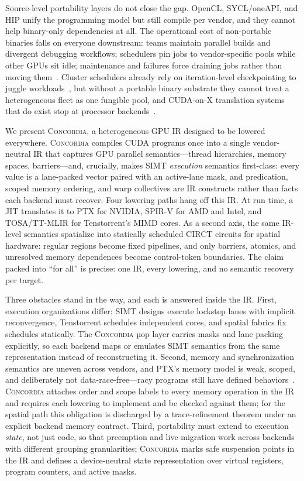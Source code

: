 \documentclass[sigplan,nonacm]{acmart}
\newcommand{\sys}{\textsc{Concordia}\xspace}
\newcommand{\circt}{CIRCT\xspace}
\begin{document}
Source-level portability layers do not close the gap.  OpenCL, SYCL/oneAPI,
and HIP unify the programming model but still compile per vendor, and they
cannot help binary-only dependencies at all.  The operational cost of
non-portable binaries falls on everyone downstream: teams maintain parallel
builds and divergent debugging workflows; schedulers pin jobs to
vendor-specific pools while other GPUs sit idle; maintenance and failures
force draining jobs rather than moving
them~\cite{xiao2018gandiva,gu2019tiresias,narayanan2020gavel,yu2020salus}.
Cluster schedulers already rely on iteration-level checkpointing to juggle
workloads~\cite{narayanan2020gavel}, but without a portable binary substrate
they cannot treat a heterogeneous fleet as one fungible pool, and
CUDA-on-X translation systems that do exist stop at processor
backends~\cite{huang2023cupbop}.

We present \sys, a heterogeneous GPU IR designed to be lowered everywhere.
\sys compiles CUDA programs once into a single vendor-neutral IR that
captures GPU parallel semantics---thread hierarchies, memory spaces,
barriers---and, crucially, makes SIMT \emph{execution} semantics
first-class: every value is a lane-packed vector paired with an active-lane
mask, and predication, scoped memory ordering, and warp collectives are IR
constructs rather than facts each backend must recover.  Four lowering paths
hang off this IR.  At run time, a JIT translates it to PTX for NVIDIA,
SPIR-V for AMD and Intel, and TOSA/TT-MLIR for Tenstorrent's MIMD cores.  As
a second axis, the same IR-level semantics spatialize into statically
scheduled \circt circuits for spatial hardware: regular regions become fixed
pipelines, and only barriers, atomics, and unresolved memory dependences
become control-token boundaries.  The claim packed into ``for all'' is
precise: one IR, every lowering, and no semantic recovery per target.

Three obstacles stand in the way, and each is answered inside the IR.
First, execution organizations differ: SIMT designs execute lockstep lanes
with implicit reconvergence, Tenstorrent schedules independent cores, and
spatial fabrics fix schedules statically.  The \sys µop layer carries
masks and lane packing explicitly, so each backend maps or emulates SIMT
semantics from the same representation instead of reconstructing it.  Second,
memory and synchronization semantics are uneven across vendors, and PTX's
memory model is weak, scoped, and deliberately not data-race-free---racy
programs still have defined
behaviors~\cite{lustig2019ptx}.  \sys attaches order and scope labels to
every memory operation in the IR and requires each lowering to implement and
be checked against them; for the spatial path this obligation is discharged
by a trace-refinement theorem under an explicit backend memory contract.
Third, portability must extend to execution \emph{state}, not just code, so
that preemption and live migration work across backends with different
grouping granularities; \sys marks safe suspension points in the IR and
defines a device-neutral state representation over virtual registers,
program counters, and active masks.
\end{document}
